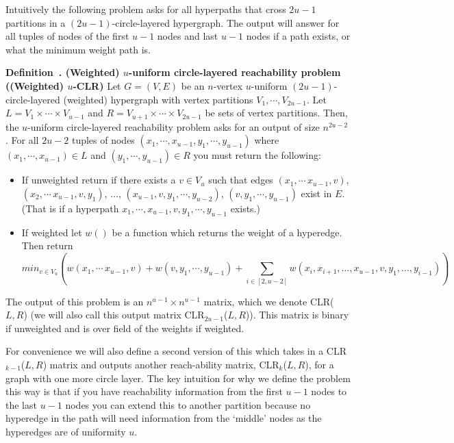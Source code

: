 \documentclass[11pt,letterpaper,pdftex]{article}
\newcounter{definition}
\newenvironment{definition}[1][]{\refstepcounter{definition}\par\medskip
   \noindent \textbf{Definition~\thedefinition. #1} \rmfamily}{\medskip}
\begin{document}
\newcommand{\uCLR}{$u$-CLR}

Intuitively the following problem asks for all hyperpaths that cross $2u-1$ partitions in a $(2u-1)$-circle-layered hypergraph. The output will answer for all tuples of nodes of the first $u-1$ nodes and last $u-1$ nodes if a path exists, or what the minimum weight path is. 

\begin{definition}[(Weighted) $u$-uniform circle-layered reachability problem ((Weighted) \uCLR)] \label{def: u-CLR}
Let $G=(V,E)$ be an $n$-vertex $u$-uniform $(2u-1)$-circle-layered (weighted) hypergraph with vertex partitions $V_1, \cdots, V_{2u-1}$. 
Let $L=V_1 \times \cdots \times V_{u-1}$ and $R=V_{u+1} \times \cdots \times V_{2u-1}$ be sets of vertex partitions.
Then, the $u$-uniform circle-layered reachability problem asks for an output of size $n^{2u-2}$. 
For all $2u-2$ tuples of nodes $(x_1, \cdots, x_{u-1}, y_1, \cdots, y_{u-1})$  where $(x_1, \cdots, x_{u-1}) \in L$ and  $(y_1, \cdots, y_{u-1}) \in R$ you must return the following:
\begin{itemize}
    \item If unweighted return if there exists a $v \in V_{u}$ 
such that edges $(x_1, \cdots \, x_{u-1},v)$, $(x_2, \cdots \, x_{u-1},v,y_1)$,  $\ldots$, $(x_{u-1},v, y_1, \cdots, y_{u-2})$, $(v, y_1, \cdots, y_{u-1})$ exist  in $E$. (That is if a hyperpath $x_1, \cdots, x_{u-1}, v, y_1, \cdots, y_{u-1}$ exists.)  
    \item If weighted let $w()$ be a function which returns the weight of a hyperedge. Then return 
    $$ min_{v\in V_{u}}  \left( w(x_1, \cdots \, x_{u-1},v)+ w(v, y_1, \cdots, y_{u-1}) + \sum_{i\in [2,u-2]} w(x_i,x_{i+1},\ldots,x_{u-1}, v, y_1, \ldots, y_{i-1}) \right) $$
\end{itemize}
  
The output of this problem is an $n^{u-1} \times n^{u-1}$ matrix, which we denote CLR($L,R$) (we will also call this output matrix CLR$_{2u-1}$($L,R$)). This matrix is binary if unweighted and is over field of the weights if weighted. 
\end{definition}

For convenience we will also define a second version of this which takes in a CLR$_{k-1}$($L,R$) matrix and outputs another reach-ability matrix, CLR$_{k}$($L,R$),  for a graph with one more circle layer. The key intuition for why we define the problem this way is that if you have reachability information from the first $u-1$ nodes to the last $u-1$ nodes you can extend this to another partition because no hyperedge in the path will need information from the `middle' nodes as the hyperedges are of uniformity $u$.
\newcommand{\uECLR}[2]{$(#1,#2)$-ECLR}
\end{document}
